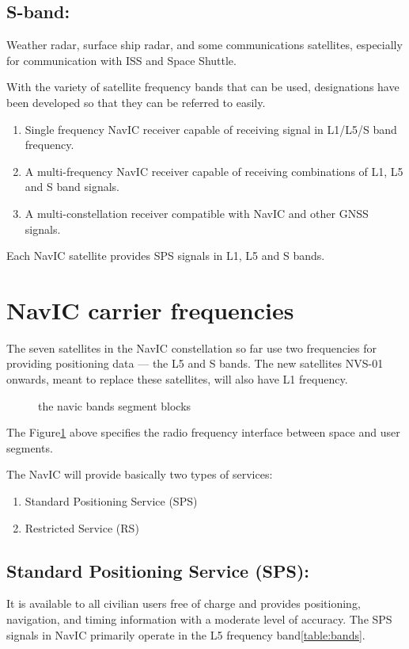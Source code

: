 \subsection{S-band:}
Weather radar, surface ship radar, and some communications satellites, especially for communication with ISS and Space Shuttle. 
	

With the variety of satellite frequency bands that can be used, designations have been developed so that they can be referred to easily. 
\begin{enumerate}
	\item Single frequency NavIC receiver capable of receiving signal in L1/L5/S band frequency.
	\item A multi-frequency NavIC receiver capable of receiving combinations of L1, L5 and S band signals.
	\item A multi-constellation receiver compatible with NavIC and other GNSS signals.
\end{enumerate}


Each NavIC satellite provides SPS signals in L1, L5 and S bands.

\section{NavIC carrier frequencies}	
The seven satellites in the NavIC constellation so far use two frequencies for providing positioning data — the L5 and S bands. The new satellites NVS-01 onwards, meant to replace these satellites, will also have L1 frequency.


	\begin{figure}[h!]
	\centering
	
	\caption{the navic bands segment blocks}
	\label{figs:bandsfig}
	\end{figure}

The Figure\ref{figs:bandsfig} above specifies the radio frequency interface between space and user segments.

The NavIC will provide basically two types of services:
	\begin{enumerate}
	\item Standard Positioning Service (SPS)
	\item Restricted Service (RS)
	\end{enumerate}

		

\subsection{Standard Positioning Service (SPS):}
	It is available to all civilian users free of charge and provides positioning, navigation, and timing information with a moderate level of accuracy. The SPS signals in NavIC primarily operate in the L5 frequency band\ref{table:bands}.
